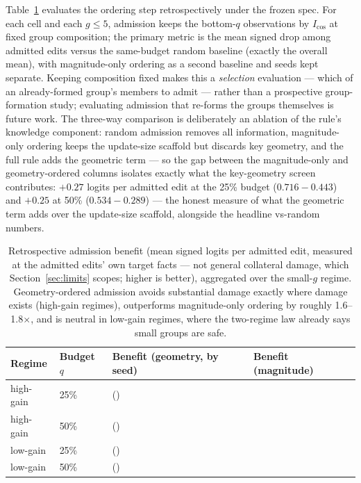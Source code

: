 \documentclass[preprint,12pt]{elsarticle}
\begin{document}
Table~\ref{tab:benefit} evaluates the ordering step retrospectively under the frozen spec.
For each cell and each $g\leq5$, admission keeps the bottom-$q$ observations by $I_{\cos}$ at
fixed group composition; the primary metric is the mean signed drop among admitted edits
versus the same-budget random baseline (exactly the overall mean), with magnitude-only
ordering as a second baseline and seeds kept separate. Keeping composition fixed makes
this a \emph{selection} evaluation --- which of an already-formed group's members to
admit --- rather than a prospective group-formation study; evaluating admission that
re-forms the groups themselves is future work. The three-way comparison is
deliberately an ablation of the rule's knowledge component: random admission removes
all information, magnitude-only ordering keeps the update-size scaffold but discards
key geometry, and the full rule adds the geometric term --- so the gap between the
magnitude-only and geometry-ordered columns isolates exactly what the key-geometry
screen contributes: $+0.27$ logits per admitted edit at the 25\% budget
($0.716-0.443$) and $+0.25$ at 50\% ($0.534-0.289$) --- the honest measure of what
the geometric term adds over the update-size scaffold, alongside the headline
vs-random numbers.

\begin{table}[htbp]
\centering
\caption{Retrospective admission benefit (mean signed logits per admitted edit,
measured at the admitted edits' own target facts --- not general collateral damage,
which Section~\ref{sec:limits} scopes; higher is better), aggregated over the
small-$g$ regime. Geometry-ordered admission avoids substantial
damage exactly where damage exists (high-gain regimes), outperforms magnitude-only ordering
by roughly 1.6--1.8$\times$, and is neutral in low-gain regimes, where the two-regime law
already says small groups are safe.}
\label{tab:benefit}
{\small
\begin{tabular}{llll}
\toprule
Regime & Budget $q$ & Benefit (geometry, by seed) & Benefit (magnitude) \\
\midrule
high-gain & 25\% & \benefitHighQtwofive{} \; (\benefitHighQtwofiveSeeds{}) & \benefitMagQtwofive{} \\
high-gain & 50\% & \benefitHighQfifty{} \; (\benefitHighQfiftySeeds{})     & \benefitMagQfifty{} \\
low-gain  & 25\% & \benefitLowQtwofive{} \; (\benefitLowQtwofiveSeeds{})    & \benefitMagLowQtwofive{} \\
low-gain  & 50\% & \benefitLowQfifty{} \; (\benefitLowQfiftySeeds{})        & \benefitMagLowQfifty{} \\
\bottomrule
\end{tabular}
}
\end{table}
\end{document}
